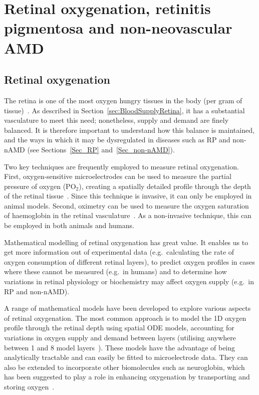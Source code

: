 \documentclass{article}
\begin{document}
\section{Retinal oxygenation, retinitis pigmentosa and non-neovascular AMD}\label{Sec_Ox_RP_non-nAMD}
%
%
\subsection{Retinal oxygenation}\label{Sec_Oxygen}
%
The retina is one of the most oxygen hungry tissues in the body (per gram of tissue)~\cite{Anderson_1968,Anderson_and_Saltzman_1964,Yu_and_Cringle_2001,W-Wirawan_and_Linsenmeier_2003}. As described in Section~\ref{sec:BloodSupplyRetina}, it has a substantial vasculature to meet this need; nonetheless, supply and demand are finely balanced. It is therefore important to understand how this balance is maintained, and the ways in which it may be dysregulated in diseases such as RP and non-nAMD (see Sections~\ref{Sec_RP} and~\ref{Sec_non-nAMD}).

Two key techniques are frequently employed to measure retinal oxygenation. First, oxygen-sensitive microelectrodes can be used to measure the partial pressure of oxygen (PO$_2$), creating a spatially detailed profile through the depth of the retinal tissue~\cite{Linsenmeier_and_Zhang_2017}. Since this technique is invasive, it can only be employed in animal models. Second, oximetry can be used to measure the oxygen saturation of haemoglobin in the retinal vasculature~\cite{Linsenmeier_and_Zhang_2017}. As a non-invasive technique, this can be employed in both animals and humans.

Mathematical modelling of retinal oxygenation has great value. It enables us to get more information out of experimental data (e.g.\ calculating the rate of oxygen consumption of different retinal layers), to predict oxygen profiles in cases where these cannot be measured (e.g.\ in humans) and to determine how variations in retinal physiology or biochemistry may affect oxygen supply (e.g.\ in RP and non-nAMD).

A range of mathematical models have been developed to explore various aspects of retinal oxygenation. The most common approach is to model the 1D oxygen profile through the retinal depth using spatial ODE models, accounting for variations in oxygen supply and demand between layers (utilising anywhere between 1 and 8 model layers~\cite{Braun_et_al_1995,Cringle_and_Yu_2002,Dollery_et_al_1969,Haugh_et_al_1990,Linsenmeier_1986,Stefansson_1988}). These models have the advantage of being analytically tractable and can easily be fitted to microelectrode data. They can also be extended to incorporate other biomolecules such as neuroglobin, which has been suggested to play a role in enhancing oxygenation by transporting and storing oxygen~\cite{Fago_et_al_2004_b,Roberts_et_al_2016a}.
\end{document}
